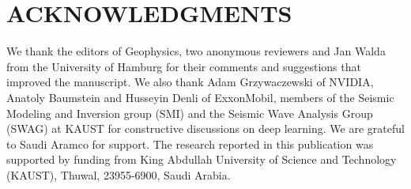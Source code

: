 \documentclass[paper,twocolomn]{geophysics}
\begin{document}
\section{ACKNOWLEDGMENTS}

We thank the editors of Geophysics, two anonymous reviewers and Jan Walda from the University of Hamburg for their comments and suggestions that improved the manuscript.  
We also thank Adam Grzywaczewski of NVIDIA, Anatoly Baumstein and Husseyin Denli of ExxonMobil, members of the Seismic Modeling and Inversion group (SMI) and the Seismic Wave Analysis Group (SWAG) at KAUST for constructive discussions on deep learning. We are grateful to Saudi Aramco for support.
The research reported in this publication was supported by funding from King Abdullah University of Science and Technology (KAUST), Thuwal, 23955-6900, Saudi Arabia.

%





\end{document}
